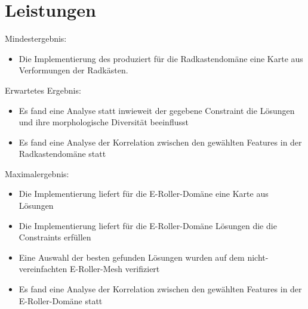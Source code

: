 \documentclass[12pt]{article}
\begin{document}
\section{Leistungen}
Mindestergebnis:
\begin{itemize}  
\item Die Implementierung des produziert für die Radkastendomäne eine Karte aus Verformungen der Radkästen.
\end{itemize}
Erwartetes Ergebnis:
\begin{itemize}  
\item Es fand eine Analyse statt inwieweit der gegebene Constraint die Lösungen und ihre morphologische Diversität beeinflusst
\item Es fand eine Analyse der Korrelation zwischen den gewählten Features in der Radkastendomäne statt
\end{itemize}
Maximalergebnis:
\begin{itemize}  
\item Die Implementierung liefert für die E-Roller-Domäne eine Karte aus Lösungen
\item Die Implementierung liefert für die E-Roller-Domäne Lösungen die die Constraints erfüllen
\item Eine Auswahl der besten gefunden Lösungen wurden auf dem nicht-vereinfachten E-Roller-Mesh verifiziert
\item Es fand eine Analyse der Korrelation zwischen den gewählten Features in der E-Roller-Domäne statt
\end{itemize}

\newpage{}

\end{document}
